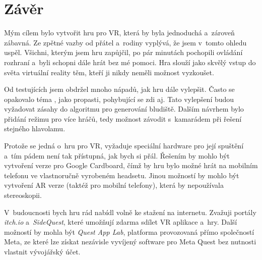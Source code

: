 \chapter*{Závěr}

Mým cílem bylo vytvořit hru pro VR, která by byla jednoduchá a~zároveň zábavná. Ze zpětné vazby od přátel a~rodiny vyplývá, že jsem v~tomto ohledu uspěl. Všichni, kterým jsem hru zapůjčil, po pár minutách pochopili ovládání rozhraní a~byli schopni dále hrát bez mé pomoci. Hra slouží jako skvělý vstup do světa virtuální reality těm, kteří ji nikdy neměli možnost vyzkoušet.

Od testujících jsem obdržel mnoho nápadů, jak hru dále vylepšit. Často se opakovalo téma , jako propasti, pohybující se zdi aj. Tato vylepšení budou vyžadovat zásahy do algoritmu pro generování bludiště. Dalším návrhem bylo přidání režimu pro více hráčů, tedy možnost závodit s~kamarádem při řešení stejného hlavolamu.

Protože se jedná o~hru pro VR, vyžaduje speciální hardware pro její spuštění a~tím pádem není tak přístupná, jak bych si přál. Řešením by mohlo být vytvoření verze pro Google Cardboard, čímž by hru bylo možné hrát na mobilním telefonu ve vlastnoručně vyrobeném headsetu. Jinou možností by mohlo být vytvoření AR verze (taktéž pro mobilní telefony), která by nepoužívala stereoskopii.

V~budoucnosti bych hru rád nabídl volně ke stažení na internetu. Zvažuji portály \textit{itch.io} a~\textit{SideQuest}, které umožňují zdarma sdílet VR aplikace a~hry. Další možností by mohla být \textit{Quest App Lab}, platforma provozovaná přímo společností Meta, ze které lze získat nezávisle vyvíjený software pro Meta Quest bez nutnosti vlastnit vývojářský účet.